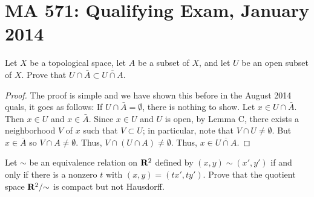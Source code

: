 \section{MA 571: Qualifying Exam, January 2014}
\begin{problem}
Let $X$ be a topological space, let $A$ be a subset of $X$, and let $U$ be
an open subset of $X$. Prove that $U\cap\bar A\subset\overline{U\cap A}$.
\end{problem}
\begin{proof}
The proof is simple and we have shown this before in the August 2014
quals, it goes as follows: If $U\cap\bar A=\emptyset$, there is nothing to
show. Let $x\in U\cap\bar A$. Then $x\in U$ and $x\in\bar A$. Since $x\in
U$ and $U$ is open, by Lemma C, there exists a neighborhood $V$ of $x$ such
that $V\subset U$; in particular, note that $V\cap U\neq\emptyset$. But
$x\in\bar A$ so $V\cap A\neq\emptyset$. Thus, $V\cap(U\cap
A)\neq\emptyset$. Thus, $x\in\overline{U\cap A}$.
\end{proof}
\begin{problem}
Let $\sim$ be an equivalence relation on $\mathbf{R}^2$ defined by
$(x,y)\sim(x',y')$ if and only if there is a nonzero $t$ with
$(x,y)=(tx',ty')$. Prove that the quotient space $\mathbf{R}^2/{\sim}$ is compact
but not Hausdorff.
\end{problem}
